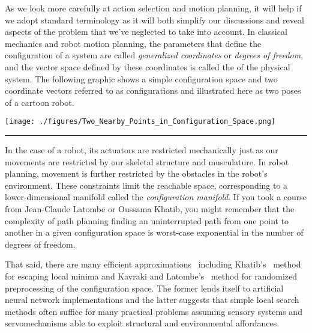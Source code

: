 
As we look more carefully at action selection and motion planning, it will help if we adopt standard terminology as it will both simplify our discussions and reveal aspects of the problem that we've neglected to take into account. In classical mechanics and robot motion planning, the parameters that define the configuration of a system are called {\it{generalized coordinates}} or {\it{degrees of freedom}}, and the vector space defined by these coordinates is called the {} of the physical system. The following graphic shows a simple configuration space and two coordinate vectors referred to as configurations and illustrated here as two poses of a cartoon robot.


\begin{center}
  \texttt{[image: ./figures/Two\_Nearby\_Points\_in\_Configuration\_Space.png]}
\end{center}


\hrule{}


In the case of a robot, its actuators are restricted mechanically just as our movements are restricted by our skeletal structure and musculature. In robot planning, movement is further restricted by the obstacles in the robot's environment. These constraints limit the reachable space, corresponding to a lower-dimensional manifold called the {\it{configuration manifold}}. If you took a course from Jean-Claude Latombe or Oussama Khatib, you might remember that the complexity of path planning {\emdash{}} finding an uninterrupted path from one point to another in a given configuration space {\emdash{}} is worst-case exponential in the number of degrees of freedom.

That said, there are many efficient approximations~\cite{Latombe90} including Khatib's~\cite{KhatibIJRR-86} {} method for escaping local minima and Kavraki and Latombe's~\cite{KavrakiandLatombeIEEE-94} method for randomized preprocessing of the configuration space. The former lends itself to artificial neural network implementations and the latter suggests that simple local search methods often suffice for many practical problems assuming sensory systems and servomechanisms able to exploit structural and environmental affordances.

